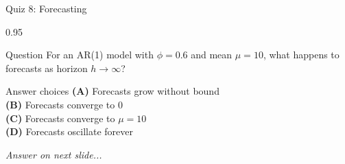 \documentclass[9pt, aspectratio=169, t]{beamer}
\begin{document}
\begin{frame}{Quiz 8: Forecasting}
    \begin{cminipage}{0.95\textwidth}
    \begin{alertblock}{Question}
        For an AR(1) model with $\phi = 0.6$ and mean $\mu = 10$, what happens to forecasts as horizon $h \to \infty$?
    \end{alertblock}

    \vspace{0.4cm}

    \begin{block}{Answer choices}
        \textcolor{MainBlue}{\textbf{(A)}} Forecasts grow without bound\\[3pt]
        \textcolor{MainBlue}{\textbf{(B)}} Forecasts converge to 0\\[3pt]
        \textcolor{MainBlue}{\textbf{(C)}} Forecasts converge to $\mu = 10$\\[3pt]
        \textcolor{MainBlue}{\textbf{(D)}} Forecasts oscillate forever
    \end{block}

    \vspace{0.5cm}

    \begin{center}
        \textit{Answer on next slide...}
    \end{center}
    \end{cminipage}
\end{frame}
\end{document}
